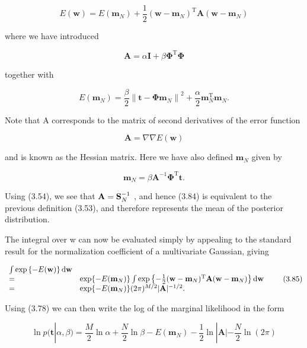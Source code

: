 \documentclass[
  10
]{article}
\begin{document}
\[
E (\mathbf {w}) = E (\mathbf {m} _ {N}) + \frac {1}{2} (\mathbf {w} - \mathbf {m} _ {N}) ^ {\mathrm{T}} \mathbf {A} (\mathbf {w} - \mathbf {m} _ {N})\tag{3.80}
\]

where we have introduced

\[
\mathbf {A} = \alpha \mathbf {I} + \beta \boldsymbol {\Phi} ^ {\mathrm{T}} \boldsymbol {\Phi}\tag{3.81}
\]

together with

\[
E (\mathbf {m} _ {N}) = \frac {\beta}{2} \left\| \mathbf {t} - \boldsymbol {\Phi} \mathbf {m} _ {N} \right\| ^ {2} + \frac {\alpha}{2} \mathbf {m} _ {N} ^ {\mathrm{T}} \mathbf {m} _ {N}.\tag{3.82}
\]

Note that A corresponds to the matrix of second derivatives of the error
function

\[
\mathbf {A} = \nabla \nabla E (\mathbf {w})\tag{3.83}
\]

and is known as the Hessian matrix. Here we have also defined
\(\mathbf { m } _ { N }\) given by

\[
\mathbf {m} _ {N} = \beta \mathbf {A} ^ {- 1} \boldsymbol {\Phi} ^ {\mathrm{T}} \mathbf {t}.\tag{3.84}
\]

Using (3.54), we see that \({ \bf A } = { \bf S } _ { N } ^ { - 1 }\) ,
and hence (3.84) is equivalent to the previous definition (3.53), and
therefore represents the mean of the posterior distribution.

The integral over w can now be evaluated simply by appealing to the
standard result for the normalization coefficient of a multivariate
Gaussian, giving

\[
\begin{array}{l l} \int \exp \left\{- E (\mathbf {w}) \right\}   \mathrm{d} \mathbf {w} \\ = & \exp \{- E (\mathbf {m} _ {N}) \} \int \exp \left\{- \frac {1}{2} (\mathbf {w} - \mathbf {m} _ {N}) ^ {\mathrm{T}} \mathbf {A} (\mathbf {w} - \mathbf {m} _ {N}) \right\}   \mathrm{d} \mathbf {w} \\ = & \exp \{- E (\mathbf {m} _ {N}) \} (2 \pi) ^ {M / 2} | \mathbf {A} | ^ {- 1 / 2}. \end{array}\tag{3.85}
\]

Using (3.78) we can then write the log of the marginal likelihood in the
form

\[
\ln p (\mathbf {t} | \alpha , \beta) = \frac {M}{2} \ln \alpha + \frac {N}{2} \ln \beta - E (\mathbf {m} _ {N}) - \frac {1}{2} \ln | \mathbf {A} | - \frac {N}{2} \ln (2 \pi)\tag{3.86}
\]
\end{document}
